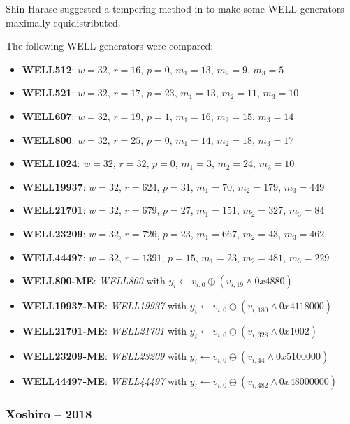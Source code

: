     Shin Harase suggested a tempering method in \cite{Harase:2009} to make some WELL generators maximally equidistributed.

    The following WELL generators were compared:
    \begin{itemize}
        \itemsep0em
        \item \textbf{WELL512}: $w = 32$, $r = 16$, $p = 0$, $m_1 = 13$, $m_2 = 9$, $m_3 = 5$
        \item \textbf{WELL521}: $w = 32$, $r = 17$, $p = 23$, $m_1 = 13$, $m_2 = 11$, $m_3 = 10$
        \item \textbf{WELL607}: $w = 32$, $r = 19$, $p = 1$, $m_1 = 16$, $m_2 = 15$, $m_3 = 14$
        \item \textbf{WELL800}: $w = 32$, $r = 25$, $p = 0$, $m_1 = 14$, $m_2 = 18$, $m_3 = 17$
        \item \textbf{WELL1024}: $w = 32$, $r = 32$, $p = 0$, $m_1 = 3$, $m_2 = 24$, $m_3 = 10$
        \item \textbf{WELL19937}: $w = 32$, $r = 624$, $p = 31$, $m_1 = 70$, $m_2 = 179$, $m_3 = 449$
        \item \textbf{WELL21701}: $w = 32$, $r = 679$, $p = 27$, $m_1 = 151$, $m_2 = 327$, $m_3 = 84$
        \item \textbf{WELL23209}: $w = 32$, $r = 726$, $p = 23$, $m_1 = 667$, $m_2 = 43$, $m_3 = 462$
        \item \textbf{WELL44497}: $w = 32$, $r = 1391$, $p = 15$, $m_1 = 23$, $m_2 = 481$, $m_3 = 229$
        \item \textbf{WELL800-ME}: \textit{WELL800} with $y_i \leftarrow v_{i, 0} \oplus \left(v_{i, 19} \land 0x4880\right)$
        \item \textbf{WELL19937-ME}: \textit{WELL19937} with $y_i \leftarrow v_{i, 0} \oplus \left(v_{i, 180} \land 0x4118000\right)$
        \item \textbf{WELL21701-ME}: \textit{WELL21701} with $y_i \leftarrow v_{i, 0} \oplus \left(v_{i, 328} \land 0x1002\right)$
        \item \textbf{WELL23209-ME}: \textit{WELL23209} with $y_i \leftarrow v_{i, 0} \oplus \left(v_{i, 44} \land 0x5100000\right)$
        \item \textbf{WELL44497-ME}: \textit{WELL44497} with $y_i \leftarrow v_{i, 0} \oplus \left(v_{i, 482} \land 0x48000000\right)$
    \end{itemize}

\subsubsection[Xoshiro -- 2018]{Xoshiro -- 2018} \label{subsubsec:xoshiro}

